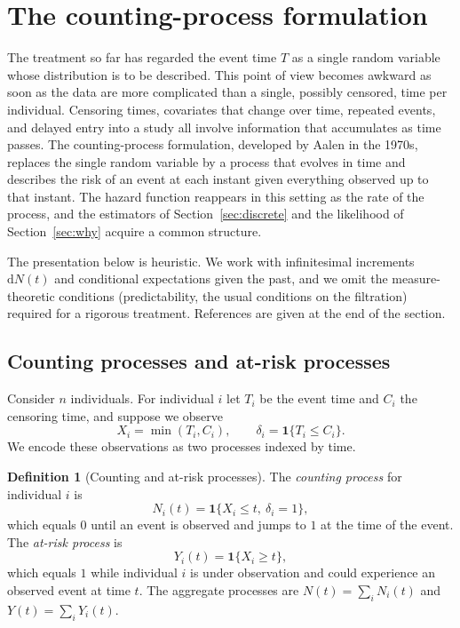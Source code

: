 \documentclass[11pt]{article}
\theoremstyle{definition}
\newtheorem{definition}{Definition}[section]
\theoremstyle{plain}
\begin{document}
\section{The counting-process formulation}\label{sec:counting}

The treatment so far has regarded the event time $T$ as a single random variable whose distribution is to be described. This point of view becomes awkward as soon as the data are more complicated than a single, possibly censored, time per individual. Censoring times, covariates that change over time, repeated events, and delayed entry into a study all involve information that accumulates as time passes. The counting-process formulation, developed by Aalen in the 1970s, replaces the single random variable by a process that evolves in time and describes the risk of an event at each instant given everything observed up to that instant. The hazard function reappears in this setting as the rate of the process, and the estimators of Section~\ref{sec:discrete} and the likelihood of Section~\ref{sec:why} acquire a common structure.

The presentation below is heuristic. We work with infinitesimal increments $\mathrm{d}N(t)$ and conditional expectations given the past, and we omit the measure-theoretic conditions (predictability, the usual conditions on the filtration) required for a rigorous treatment. References are given at the end of the section.

\subsection{Counting processes and at-risk processes}

Consider $n$ individuals. For individual $i$ let $T_i$ be the event time and $C_i$ the censoring time, and suppose we observe
\[
  X_i = \min(T_i, C_i), \qquad \delta_i = \mathbf{1}\{T_i \le C_i\}.
\]
We encode these observations as two processes indexed by time.

\begin{definition}[Counting and at-risk processes]
The \emph{counting process} for individual $i$ is
\[
  N_i(t) = \mathbf{1}\{X_i \le t,\ \delta_i = 1\},
\]
which equals $0$ until an event is observed and jumps to $1$ at the time of the event. The \emph{at-risk process} is
\[
  Y_i(t) = \mathbf{1}\{X_i \ge t\},
\]
which equals $1$ while individual $i$ is under observation and could experience an observed event at time $t$. The aggregate processes are $N(t) = \sum_i N_i(t)$ and $Y(t) = \sum_i Y_i(t)$.
\end{definition}
\end{document}
